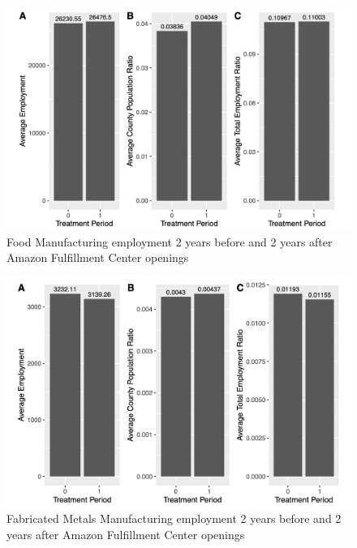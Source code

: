 \documentclass[11pt]{article}
\begin{document}
\begin{figure}[H]
\centering
\includegraphics[width=15cm]{FOODMF.png}
\caption{Food Manufacturing employment 2 years before and 2 years after Amazon Fulfillment Center openings}
\end{figure}

\begin{figure}[H]
\centering
\includegraphics[width=15cm]{FABMETMF.png}
\caption{Fabricated Metals Manufacturing employment 2 years before and 2 years after Amazon Fulfillment Center openings}
\end{figure}
\end{document}
